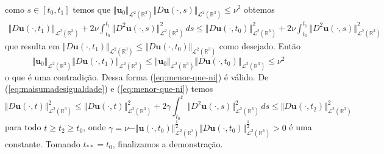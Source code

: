 \documentclass[a4paper, 11pt]{book}
\theoremstyle{definition}
\newcommand{\bR}{\mathbb{R}}
\newcommand{\bu}{\mathbf{u}}
\newcommand{\cL}{\mathcal{L}}
\begin{document}
\begin{prf}
\[\begin{aligned}
        \end{aligned}
    \]
    como $s \in [t_0,t_1]$ temos que $\Vert \bu_0 \Vert_{\cL^2(\bR^3)} \Vert D\bu(\cdot,s) \Vert_{\cL^2(\bR^3)} \leqslant \nu^2$ obtemos
    \[
        \begin{aligned}
            \Vert D\bu(\cdot,t_1) \Vert_{\cL^2(\bR^3)} + 2 \nu \int_{t_0}^{t_1} \Vert D^2 \bu(\cdot,s) \Vert_{\cL^2(\bR^3)}^2 \,ds \leqslant \Vert D\bu(\cdot,t_0) \Vert_{\cL^2(\bR^3)}^2 + 2\nu  \! \int_{t_0}^{t_1} \Vert D^2\bu(\cdot,s) \Vert_{\cL^2(\bR^3)}^2
        \end{aligned}
    \]
    que resulta em $\Vert D\bu(\cdot,t_1) \Vert_{\cL^2(\bR^3)} \leqslant \Vert D\bu(\cdot,t_0) \Vert_{\cL^2(\bR^3)}$ como desejado.
    Então 
    \[
        \Vert \bu_0 \Vert_{\cL^2(\bR^3)} \Vert D\bu(\cdot,t_1) \Vert_{\cL^2(\bR^3)} \leqslant \Vert \bu_0 \Vert_{\cL^2(\bR^3)}\Vert D\bu(\cdot,t_0) \Vert_{\cL^2(\bR^3)} \leqslant \nu^2
    \]
    o que é uma contradição. Dessa forma (\ref{eq:menor-que-ni}) é válido.
    De (\ref{eq:maisumadesigualdade}) e (\ref{eq:menor-que-ni}) temos
    \[
        \Vert D\bu(\cdot,t) \Vert_{\cL^2(\bR^3)}^2 \leqslant \Vert D\bu(\cdot,t) \Vert_{\cL^2(\bR^3)}^2 + 2 \gamma \! \int_{t_0}^{t} \Vert D^2 \bu(\cdot,s) \Vert_{\cL^2(\bR^3)}^2 \,ds \leqslant \Vert D\bu(\cdot,t_2) \Vert_{\cL^2(\bR^3)}^2
    \]
    para todo $t \geqslant t_2 \geqslant t_0$, onde $\gamma = \nu - \Vert \bu(\cdot,t_0) \Vert_{\cL^2(\bR^3)}^{\frac{1}{2}} \Vert D\bu(\cdot,t_0) \Vert_{\cL^2(\bR^3)}^{\frac{1}{2}} > 0$ é uma constante.
    Tomando $t_{**} = t_0$, finalizamos a demonstração.
\end{prf}
\end{document}
